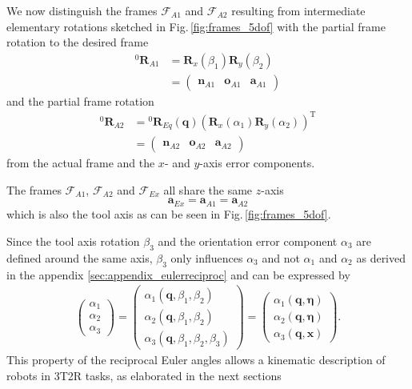 \documentclass[twocolumn,10pt]{IFTOMM}
\newcommand{\bm}[1]{\boldsymbol{#1}}
\newcommand{\vek}[3]{\boldsymbol{#1}^{#2}_{#3}}
\newcommand{\rotmat}[2]{{{ }^{#1}\boldsymbol{R}}_{#2}}
\newcommand{\transp}[0]{{\mathrm{T}}}
\newcommand{\ks}[1]{{\mathcal{F}}_{#1}}
\begin{document}
We now distinguish the frames $\ks{A1}$ and $\ks{A2}$ resulting from intermediate elementary rotations sketched in Fig.\,\ref{fig:frames_5dof} with the partial frame rotation to the desired frame
%
\begin{align}
\rotmat{0}{A1} 
&= 
\bm{R}_x(\beta_1) \bm{R}_y(\beta_2)\\
&=
\begin{pmatrix}
\vek{n}{}{A1} & \vek{o}{}{A1} & \vek{a}{}{A1}
\end{pmatrix} \nonumber
\end{align}
%
and the partial frame rotation
%
\begin{align}
\rotmat{0}{A2} 
&= 
\rotmat{0}{Eq}(\bm{q})
\left(\bm{R}_x(\alpha_1) \bm{R}_y(\alpha_2)\right)^\transp \\ 
&=
\begin{pmatrix}
\vek{n}{}{A2} & \vek{o}{}{A2} & \vek{a}{}{A2}
\end{pmatrix}\nonumber
\end{align}
%
from the actual frame and the $x$- and $y$-axis error components.

The frames $\ks{A1}$, $\ks{A2}$ and $\ks{Ex}$ all share the same $z$-axis
%
\begin{equation}
\vek{a}{}{Ex}
=
\vek{a}{}{A1}
=
\vek{a}{}{A2}
\end{equation}
%
which is also the tool axis as can be seen in Fig.\,\ref{fig:frames_5dof}.

Since the tool axis rotation $\beta_3$ and the orientation error component $\alpha_3$ are defined around the same axis, $\beta_3$ only influences $\alpha_3$ and not $\alpha_1$ and $\alpha_2$ as derived in the appendix \ref{sec:appendix_eulerreciproc} and can be expressed by
%
\begin{align}
\begin{pmatrix}
\alpha_1 \\
\alpha_2 \\
\alpha_3
\end{pmatrix}
=
\begin{pmatrix}
\alpha_1(\bm{q},\beta_1,\beta_2) \\
\alpha_2(\bm{q},\beta_1,\beta_2) \\
\alpha_3(\bm{q},\beta_1,\beta_2,\beta_3)
\end{pmatrix}
=
\begin{pmatrix}
\alpha_1(\bm{q},\bm{\eta}) \\
\alpha_2(\bm{q},\bm{\eta}) \\
\alpha_3(\bm{q},\bm{x}) 
\end{pmatrix}
\label{equ:alpha_dep_beta}.
\end{align}
%
This property of the reciprocal Euler angles allows a kinematic description of robots in 3T2R tasks, as elaborated in the next sections
\end{document}
